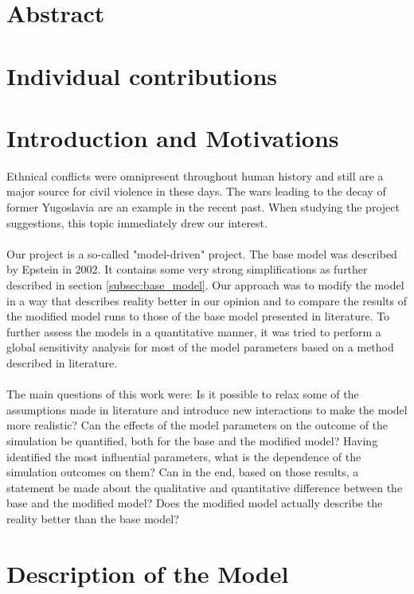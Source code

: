 \documentclass[11pt]{article}
\begin{document}
\section{Abstract}

\section{Individual contributions}

\section{Introduction and Motivations}
Ethnical conflicts were omnipresent throughout human history and still are a major source for civil violence in these days. The wars leading to the decay of former Yugoslavia are an example in the recent past. When studying the project suggestions, this topic immediately drew our interest.\\
\\
Our project is a so-called "model-driven" project. The base model was described by Epstein in 2002. It contains some very strong simplifications as further described in section \ref{subsec:base_model}. Our approach was to modify the model in a way that describes reality better in our opinion and to compare the results of the modified model runs to those of the base model presented in literature. To further assess the models in a quantitative manner, it was tried to perform a global sensitivity analysis for most of the model parameters based on a method described in literature.\\
\\
The main questions of this work were: Is it possible to relax some of the assumptions made in literature and introduce new interactions to make the model more realistic? Can the effects of the model parameters on the outcome of the simulation be quantified, both for the base and the modified model? Having identified the most influential parameters, what is the dependence of the simulation outcomes on them? Can in the end, based on those results, a statement be made about the qualitative and quantitative difference between the base and the modified model? Does the modified model actually describe the reality better than the base model?

\section{Description of the Model}
\label{sec:description_model}
\end{document}
